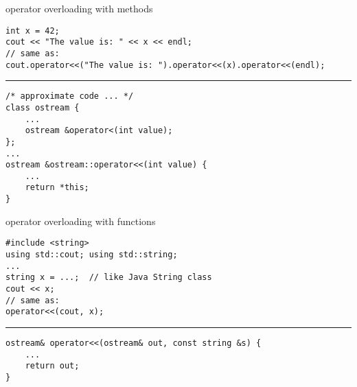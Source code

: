 \begin{frame}[fragile,label=opImplMeth]{operator overloading with methods}
\lstset{language=C++,style=smaller}
\begin{lstlisting}
int x = 42;
cout << "The value is: " << x << endl;
// same as:
cout.operator<<("The value is: ").operator<<(x).operator<<(endl);
\end{lstlisting}
\hrule
\begin{lstlisting}
/* approximate code ... */
class ostream {
    ...
    ostream &operator<(int value);
};
...
ostream &ostream::operator<<(int value) {
    ...
    return *this;
}
\end{lstlisting}
\end{frame}

\begin{frame}[fragile,label=opImplFunc]{operator overloading with functions}
\lstset{language=C++,style=smaller}
\begin{lstlisting}
#include <string>
using std::cout; using std::string;
...
string x = ...;  // like Java String class
cout << x;
// same as:
operator<<(cout, x);
\end{lstlisting}
\hrule
\begin{lstlisting}
ostream& operator<<(ostream& out, const string &s) {
    ...
    return out;
}
\end{lstlisting}
\end{frame}
